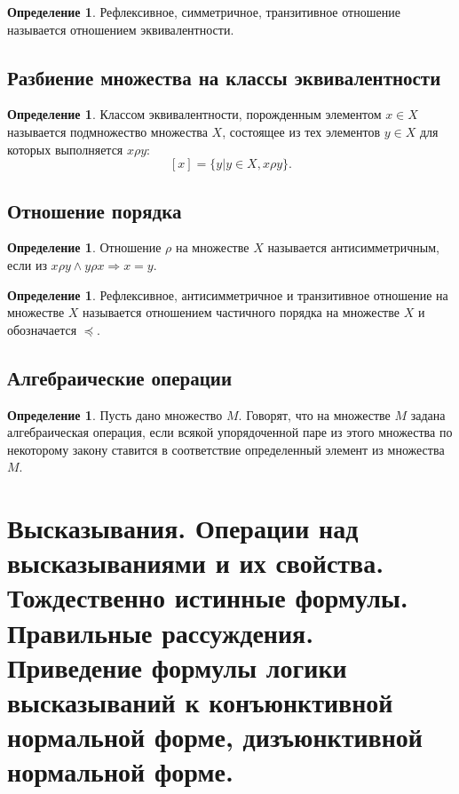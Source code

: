 \documentclass[12pt]{report}
\theoremstyle{definition}
\newtheorem{definition}[theorem]{Определение}
\begin{document}
\begin{definition}
Рефлексивное, симметричное, транзитивное отношение называется отношением
эквивалентности.
\end{definition}

\subsection{Разбиение множества на классы эквивалентности}
\begin{definition}
Классом эквивалентности, порожденным элементом $x \in X$
называется подмножество множества $X$, состоящее из
тех элементов $y \in X$ для которых выполняется
$x \rho y$:
$$
[x] = \{y | y \in X, x \rho y\}.
$$
\end{definition}

\subsection{Отношение порядка}
\begin{definition}
Отношение $\rho$ на множестве $X$ называется антисимметричным,
если из $x\rho y \land y \rho x \Rightarrow x = y$.
\end{definition}

\begin{definition}
Рефлексивное, антисимметричное и транзитивное отношение на множестве $X$
называется отношением частичного порядка на множестве $X$ и
обозначается $\preccurlyeq$.
\end{definition}

\subsection{Алгебраические операции}
\begin{definition}
Пусть дано множество $M$. Говорят, что на множестве $M$
задана алгебраическая операция, если всякой упорядоченной паре
из этого множества по некоторому закону ставится в соответствие
определенный элемент из множества $M$.
\end{definition}


\section
{
  Высказывания. Операции над высказываниями и их свойства.
  Тождественно истинные формулы. Правильные рассуждения. 
  Приведение формулы логики высказываний к конъюнктивной нормальной
  форме, дизъюнктивной нормальной форме.
}
\end{document}
